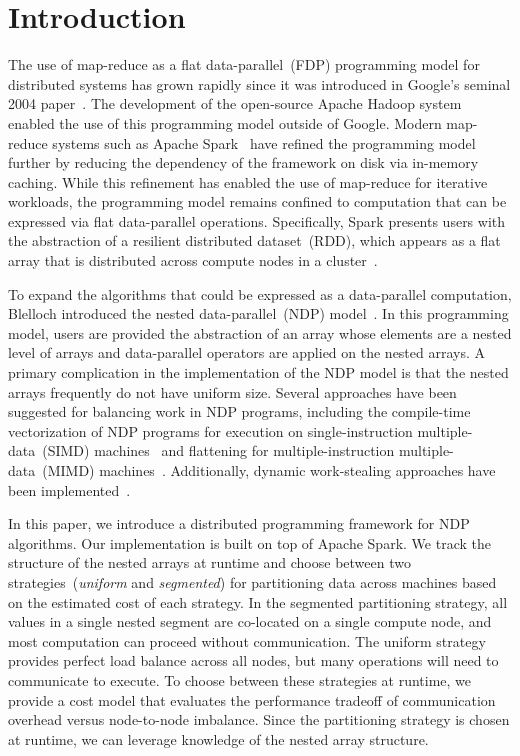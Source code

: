 \documentclass[preprint]{sigplanconf}
\theoremstyle{definition}
\begin{document}
\section{Introduction}
\label{sec:introduction}

The use of map-reduce as a flat data-parallel~(FDP) programming model for distributed systems has
grown rapidly since it was introduced in Google's seminal 2004 paper~\cite{dean04}. The development
of the open-source Apache Hadoop system enabled the use of this programming model outside of
Google. Modern map-reduce systems such as Apache Spark~\cite{zaharia10} have refined the
programming model further by reducing the dependency of the framework on disk via in-memory
caching. While this refinement has enabled the use of map-reduce for iterative workloads, the
programming model remains confined to computation that can be expressed via flat data-parallel
operations. Specifically, Spark presents users with the abstraction of a resilient distributed
dataset~(RDD), which appears as a flat array that is distributed across compute nodes in a
cluster~\cite{zaharia12}.

To expand the algorithms that could be expressed as a data-parallel computation, Blelloch introduced
the nested data-\linebreak parallel~(NDP) model~\cite{blelloch90thesis}. In this programming model,
users are provided the abstraction of an array whose elements are a nested level of arrays and
data-parallel operators are applied on the nested arrays. A primary complication in the implementation
of the NDP model is that the nested arrays frequently do not have uniform size. Several approaches
have been suggested for balancing work in NDP programs, including the compile-time vectorization of
NDP programs for execution on single-instruction multiple-data~(SIMD)
machines~\cite{blelloch90thesis, blelloch90compiling} and flattening for multiple-instruction
multiple-data~(MIMD) machines~\cite{bergstrom13}. Additionally, dynamic work-stealing approaches
have been implemented~\cite{bergstrom10}.

In this paper, we introduce a distributed programming framework for NDP algorithms. Our
implementation is built on top of Apache Spark. We track the structure of the nested arrays at runtime
and choose between two strategies~(\emph{uniform} and \emph{segmented}) for partitioning data
across machines based on the estimated cost of each strategy. In the segmented partitioning strategy,
all values in a single nested segment are co-located on a single compute node, and most computation
can proceed without communication. The uniform strategy provides perfect load balance across all
nodes, but many operations will need to communicate to execute. To choose between these strategies
at runtime, we provide a cost model that evaluates the performance tradeoff of communication overhead 
versus node-to-node imbalance. Since the partitioning strategy is chosen at runtime, we can leverage
knowledge of the nested array structure.
\end{document}
